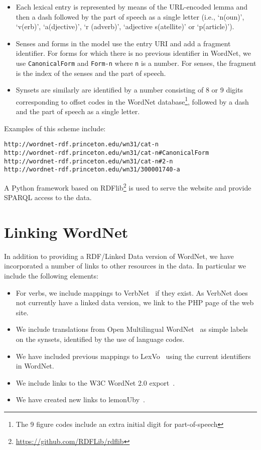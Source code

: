 \documentclass[10pt, a4paper]{article}
\begin{document}
\begin{itemize}
  \item Each lexical entry is represented by means of the URL-encoded lemma and
    then a dash followed by the part of speech as a single letter (i.e., `n(oun)',
    `v(erb)', `a(djective)', `r (adverb)', `adjective s(atellite)' or `p(article)').    
    
  \item Senses and forms in the model use the entry URI and add a fragment identifier. For forms for which there is no previous identifier in WordNet, we
    use {\tt CanonicalForm} and {\tt Form-n} where {\tt n} is a number.
    For senses, the fragment is the index of the senses and the part of
    speech.
  \item Synsets are similarly are identified by a number consisting of 8 or 9 digits corresponding to offset codes in the WordNet database\footnote{The 9 figure codes
      include an extra initial digit for part-of-speech}, followed by a dash and the part of speech as a single letter.
\end{itemize}

Examples of this scheme include:

{\scriptsize
\begin{verbatim}
http://wordnet-rdf.princeton.edu/wn31/cat-n
http://wordnet-rdf.princeton.edu/wn31/cat-n#CanonicalForm
http://wordnet-rdf.princeton.edu/wn31/cat-n#2-n
http://wordnet-rdf.princeton.edu/wn31/300001740-a
\end{verbatim}}


A Python framework based on RDFlib\footnote{\url{https://github.com/RDFLib/rdflib}} is used to serve the website and
provide SPARQL access to the data.

\section{Linking WordNet}

In addition to providing a RDF/Linked Data version of WordNet, we have incorporated a number of links to other resources in the data. In particular
we include the following elements:

\begin{itemize}
  \item For verbs, we include mappings to VerbNet~\cite{schuler2005verbnet} if they exist. As
    VerbNet does not currently have a linked data version, we link to the
    PHP page of the web site.
  \item We include translations from Open Multilingual WordNet~\cite{bond2013linking}
    as simple labels on the synsets, identified by the use of
    language codes.
  \item We have included previous mappings to LexVo~\cite{de2008language} 
    using the current identifiers in WordNet.
  \item We include links to the W3C WordNet 2.0 export~\cite{van2006conversion}.
  \item We have created new links to lemonUby~\cite{eckle2014lemonuby}.
\end{itemize}
\end{document}
